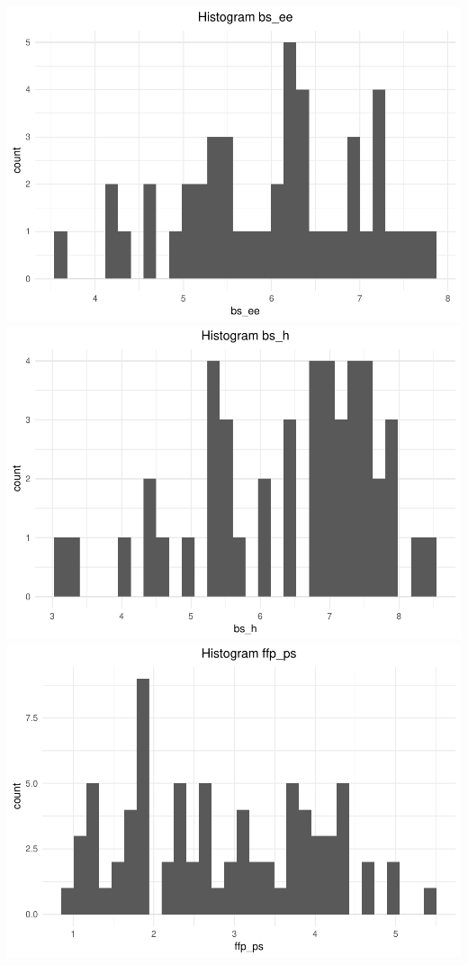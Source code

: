 \documentclass[]{elsarticle} %
\makeatletter
\def\maxwidth{\ifdim\Gin@nat@width>\linewidth\linewidth
\else\Gin@nat@width\fi}
\let\Oldincludegraphics\includegraphics
\renewcommand{\includegraphics}[1]{\Oldincludegraphics[width=\maxwidth]{#1}}
\makeatother
\begin{document}
\includegraphics{refugees-stephanie_files/figure-latex/ggplot_variables-1.pdf}
\includegraphics{refugees-stephanie_files/figure-latex/ggplot_variables-2.pdf}
\includegraphics{refugees-stephanie_files/figure-latex/ggplot_variables-3.pdf}
\end{document}
